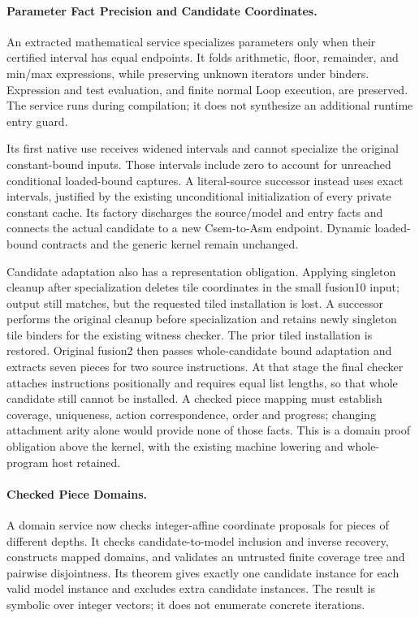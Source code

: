 \paragraph{Parameter Fact Precision and Candidate Coordinates.}
An extracted mathematical service specializes parameters only when their
certified interval has equal endpoints. It folds arithmetic, floor, remainder,
and min/max expressions, while preserving unknown iterators under binders.
Expression and test evaluation, and finite normal Loop execution, are preserved.
The service runs during compilation; it does not synthesize an additional
runtime entry guard.

Its first native use receives widened intervals and cannot specialize the
original constant-bound inputs. Those intervals include zero to account for
unreached conditional loaded-bound captures. A literal-source successor instead
uses exact intervals, justified by the existing unconditional initialization
of every private constant cache. Its factory discharges the source/model and
entry facts and connects the actual candidate to a new Csem-to-Asm endpoint.
Dynamic loaded-bound contracts and the generic kernel remain unchanged.

Candidate adaptation also has a representation obligation. Applying singleton
cleanup after specialization deletes tile coordinates in the small fusion10
input; output still matches, but the requested tiled installation is lost.
A successor performs the original cleanup before specialization and retains
newly singleton tile binders for the existing witness checker. The prior tiled
installation is restored. Original fusion2 then passes whole-candidate bound
adaptation and extracts seven pieces for two source instructions. At that stage the
final checker attaches instructions positionally and requires equal list
lengths, so that whole candidate still cannot be installed. A checked piece
mapping must establish coverage, uniqueness, action correspondence, order and
progress; changing attachment arity alone would provide none of those facts.
This is a domain proof obligation above the kernel, with the existing machine
lowering and whole-program host retained.

\paragraph{Checked Piece Domains.}
A domain service now checks integer-affine coordinate proposals for pieces of
different depths. It checks candidate-to-model inclusion and inverse recovery,
constructs mapped domains, and validates an untrusted finite coverage tree and
pairwise disjointness. Its theorem gives exactly one candidate instance for
each valid model instance and excludes extra candidate instances. The result
is symbolic over integer vectors; it does not enumerate concrete iterations.

